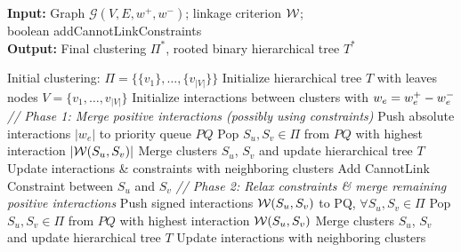 \begin{algorithm}[t]
\footnotesize
  \begin{flushleft}
  \footnotesize
  \caption{\algname{}}
   \hspace*{\algorithmicindent} \textbf{Input:} Graph $\mathcal{G}(V,E,w^+,w^-)$; linkage criterion $\mathcal{W}{}$; \\ 
   \hspace*{4.3em}boolean {\color{blue}addCannotLinkConstraints}  \\
  \hspace*{\algorithmicindent} \textbf{Output:} Final clustering $\Pi^*$, rooted binary hierarchical tree $T^*$\\
  \hspace*{\algorithmicindent} 
  \begin{algorithmic}[1]
  \footnotesize
      \State Initial clustering: $\Pi=\{\{v_1\}, \ldots, \{v_{|V|}\}\}$
      \State Initialize hierarchical tree $T$ with leaves nodes $V=\{v_1,\ldots,v_{|V|}\}$
      \State Initialize interactions between clusters with $w_e = w^+_e - w^-_e$
      \State \emph{// Phase 1: Merge positive interactions (possibly using constraints)}
      \State Push absolute interactions $|w_e|$ to priority queue $PQ$
      \Repeat 
        \State Pop $S_u,S_v\in\Pi$ from $PQ$ with highest interaction $|\mathcal{W}{}(S_u,S_v)|$
          \State Merge clusters $S_u$, $S_v$ and update hierarchical tree $T$
          \State Update interactions \& constraints with neighboring clusters
          \State Add CannotLink Constraint between $S_u$ and $S_v$
        \EndIf
      \State \emph{// Phase 2: Relax constraints \& merge remaining positive interactions}
      \State Push signed interactions $\mathcal{W}{}(S_u,S_v)$ to PQ, $\forall S_u, S_v \in \Pi$
      \Repeat 
        \State Pop $S_u,S_v\in\Pi$ from $PQ$ with highest interaction $\mathcal{W}{}(S_u,S_v)$
          \State Merge clusters $S_u$, $S_v$ and update hierarchical tree $T$
          \State Update interactions with neighboring clusters

\end{algorithmic}
\end{flushleft}
\end{algorithm}
